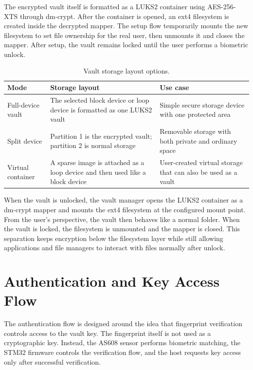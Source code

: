 The encrypted vault itself is formatted as a LUKS2 container using AES-256-XTS through dm-crypt. After the container is opened, an ext4 filesystem is created inside the decrypted mapper. The setup flow temporarily mounts the new filesystem to set file ownership for the real user, then unmounts it and closes the mapper. After setup, the vault remains locked until the user performs a biometric unlock.

\begin{table}[H]
\centering
\caption{\label{tab:vault-storage-layout}Vault storage layout options.}
\begin{tabularx}{\textwidth}{lXX}
\toprule
Mode & Storage layout & Use case\\
\midrule
Full-device vault & The selected block device or loop device is formatted as one LUKS2 vault & Simple secure storage device with one protected area\\
Split device & Partition 1 is the encrypted vault; partition 2 is normal storage & Removable storage with both private and ordinary space\\
Virtual container & A sparse image is attached as a loop device and then used like a block device & User-created virtual storage that can also be used as a vault\\
\bottomrule
\end{tabularx}
\end{table}

When the vault is unlocked, the vault manager opens the LUKS2 container as a dm-crypt mapper and mounts the ext4 filesystem at the configured mount point. From the user's perspective, the vault then behaves like a normal folder. When the vault is locked, the filesystem is unmounted and the mapper is closed. This separation keeps encryption below the filesystem layer while still allowing applications and file managers to interact with files normally after unlock.

\section{Authentication and Key Access Flow}

The authentication flow is designed around the idea that fingerprint verification controls access to the vault key. The fingerprint itself is not used as a cryptographic key. Instead, the AS608 sensor performs biometric matching, the STM32 firmware controls the verification flow, and the host requests key access only after successful verification.


